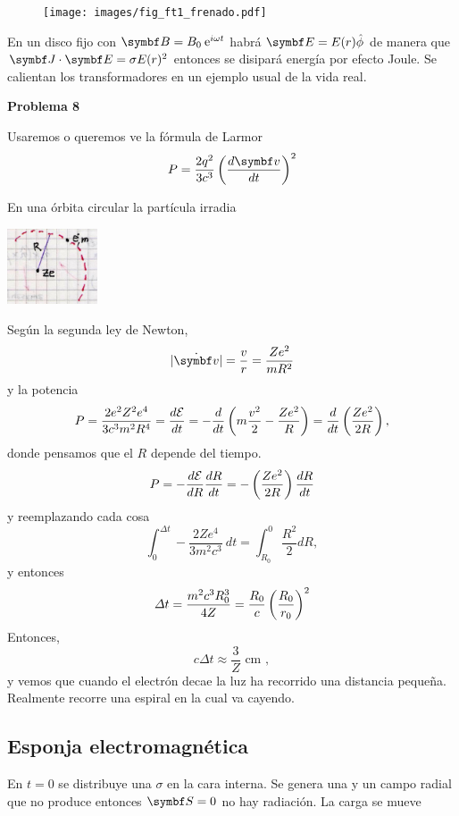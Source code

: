 \documentclass[10pt,oneside]{CBFT_book}
\begin{document}
\begin{figure}[htb]
	\begin{center}
	\texttt{[image: images/fig\_ft1\_frenado.pdf]}	 
	\end{center}
	\caption{}
\end{figure} 

En un disco fijo con $\vb{B} = B_0 \euler^{i\omega t}$  habrá $\vb{E} = E(r) \hat{\phi}$ de manera que 
$\pe{J}{E} = \sigma E(r)^2$ entonces se disipará energía por efecto Joule. Se calientan los 
transformadores en un ejemplo usual de la vida real.

\begin{ejemplo}{\bf Problema 8}

Usaremos o queremos ve la fórmula de Larmor
\[
	P = \frac{2q^2}{3c^3} \Frac{d\vb v}{dt}^2
\]

En una órbita circular la partícula irradia

\includegraphics[width=0.2\textwidth]{images/fig_ft1_orbita_circular_particula.jpg}

Según la segunda ley de Newton,
\[
	|\dot{\vb v}| = \frac{v}{r} = \frac{Ze^2}{mR^2}
\]
y la potencia
\[
	P = \frac{2e^2Z^2e^4}{3c^3m^2R^4} = \frac{d^{\hspace{-0.05em}} {\mathcal{E}}}{d {t}^{\hspace{-0.05em}}} = 
	- \frac{d^{\hspace{-0.05em}} {}}{d {t}^{\hspace{-0.05em}}}\left( m \frac{v^2}{2} - \frac{Ze^2}{R} \right)=
	\frac{d^{\hspace{-0.05em}} {}}{d {t}^{\hspace{-0.05em}}}\left( \frac{ Ze^2 }{ 2R } \right),
\]
donde pensamos que el $R$ depende del tiempo.
\[
	P = - \frac{d^{\hspace{-0.05em}} {\mathcal{E}}}{d {R}^{\hspace{-0.05em}}} \frac{d^{\hspace{-0.05em}} {R}}{d {t}^{\hspace{-0.05em}}} = - \left( \frac{ Ze^2 }{ 2R } \right) \frac{d^{\hspace{-0.05em}} {R}}{d {t}^{\hspace{-0.05em}}} 
\]
y reemplazando cada cosa
\[
	\int_0^{\Delta t} -\frac{2Ze^4}{3m^2c^3} \: dt = \int_{R_0}^0 \frac{R^2}{2}dR,
\]
y entonces
\[
	\Delta t = \frac{m^2 c^3 R_0^3}{4Z} = \frac{R_0}{c} \left( \frac{ R_0 }{ r_0 } \right)^2
\]
Entonces,
\[
	c \Delta t \approx \frac{3}{Z} \text{ cm },
\]
y vemos que cuando el electrón decae la luz ha recorrido una distancia pequeña.
Realmente recorre una espiral en la cual va cayendo.
 
\end{ejemplo}


\subsection{Esponja electromagnética}

En $t=0$ se distribuye una $\sigma$ en la cara interna. Se genera una  y un campo  radial que 
no produce  entonces $\vb{S}=0$ no hay radiación.
La carga se mueve 
\end{document}
